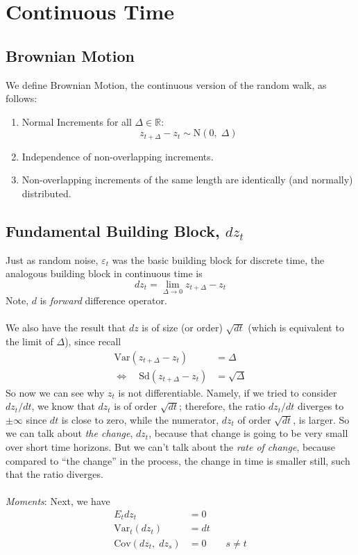 \documentclass[a4paper,12pt]{scrartcl}
\begin{document}
\newpage
\section{Continuous Time}

\subsection{Brownian Motion}

We define Brownian Motion, the continuous version of the random walk,
as follows:
\begin{enumerate}
    \item Normal Increments for all $\Delta \in \mathbb{R}$:
	\[ z_{t+\Delta} - z_t \sim \text{N}(0, \; \Delta) \]
    \item Independence of non-overlapping increments.
    \item Non-overlapping increments of the same length are
	identically (and normally) distributed.
\end{enumerate}

\subsection{Fundamental Building Block, $dz_t$}

Just as random noise, $\varepsilon_t$ was the basic building block
for discrete time, the analogous building block in continuous time is
\begin{equation}
    dz_t = \lim_{\Delta \rightarrow 0} z_{t + \Delta} - z_t
\end{equation}
Note, $d$ is \emph{forward} difference operator.
\\
\\
We also have the result that $dz$ is of size (or order) $\sqrt{dt}$ 
(which is equivalent to the limit of $\Delta$), since recall
\begin{align*}
    \text{Var}(z_{t + \Delta} - z_t) &= \Delta \\
    \Leftrightarrow \quad \text{Sd}(z_{t + \Delta} - z_t) &= 
	\sqrt{\Delta}
\end{align*}
So now we can see why $z_t$ is not differentiable.  Namely, if 
we tried to consider $dz_t/dt$, we know that $dz_t$ is of order
$\sqrt{dt}$; therefore, the ratio $dz_t/dt$ diverges to $\pm \infty$
since $dt$ is close to zero, while the numerator, $dz_t$ of order
$\sqrt{dt}$, is larger. So we can talk about \emph{the change}, $dz_t$,
because that change is going to be very small over short time horizons.
But we can't talk about the \emph{rate of change}, because compared
to ``the change'' in the process, the change in time is smaller still,
such that the ratio diverges.
\\
\\
{\sl Moments}: Next, we have
\begin{align*}
    E_t dz_t &= 0 \\
    \text{Var}_t(dz_t) &= dt \\
    \text{Cov}(dz_t, \; dz_s) &= 0 \qquad s\neq t
\end{align*}
\end{document}
